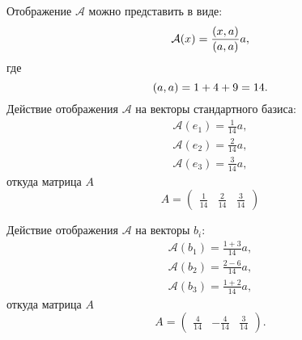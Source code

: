 \documentclass[12pt]{article}
\begin{document}
    Отображение $\mathcal{A}$ можно представить в виде:
    \[
        \mathcal{A}(x)
        = \frac{\left ( x, a \right )}{\left ( a, a \right )} a ,
    \]
    где
    \[
        \left ( a, a \right ) = 1 + 4 + 9 = 14.
    \]
    Действие отображения $\mathcal{A}$ на векторы стандартного базиса:
    \begin{gather*}
        \mathcal{A}(e_1)
        = \frac{1}{14} a, \\
        \mathcal{A}(e_2)
        = \frac{2}{14} a, \\
        \mathcal{A}(e_3)
        = \frac{3}{14} a,
    \end{gather*}
    откуда матрица $A$
    \[
        A =
        \begin{pmatrix}
            \frac{1}{14} & \frac{2}{14} & \frac{3}{14}
        \end{pmatrix}
    \]

    Действие отображения $\mathcal{A}$ на векторы $b_i$:
    \begin{gather*}
        \mathcal{A}(b_1)
        = \frac{1 + 3}{14} a, \\
        \mathcal{A}(b_2)
        = \frac{2 - 6}{14} a, \\
        \mathcal{A}(b_3)
        = \frac{1 + 2}{14} a,
    \end{gather*}
    откуда матрица $A$
    \[
        A =
        \begin{pmatrix}
            \frac{4}{14} & - \frac{4}{14} & \frac{3}{14}
        \end{pmatrix}
        .
    \]
\end{document}
